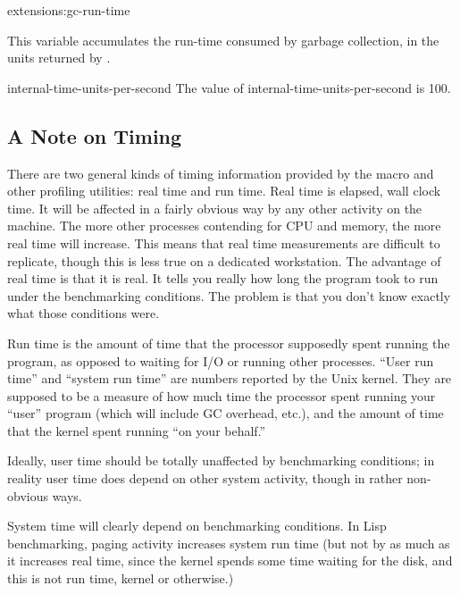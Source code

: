 \begin{defvar}{extensions:}{gc-run-time}
  
  This variable accumulates the run-time consumed by garbage
  collection, in the units returned by
  .
\end{defvar}

\begin{defconst}{}{internal-time-units-per-second}
The value of internal-time-units-per-second is 100.
\end{defconst}

\subsection{A Note on Timing}

There are two general kinds of timing information provided by the
 macro and other profiling utilities: real time and run
time.  Real time is elapsed, wall clock time.  It will be affected in
a fairly obvious way by any other activity on the machine.  The more
other processes contending for CPU and memory, the more real time will
increase.  This means that real time measurements are difficult to
replicate, though this is less true on a dedicated workstation.  The
advantage of real time is that it is real.  It tells you really how
long the program took to run under the benchmarking conditions.  The
problem is that you don't know exactly what those conditions were.

Run time is the amount of time that the processor supposedly spent
running the program, as opposed to waiting for I/O or running other
processes.  ``User run time'' and ``system run time'' are numbers
reported by the Unix kernel.  They are supposed to be a measure of how
much time the processor spent running your ``user'' program (which
will include GC overhead, etc.), and the amount of time that the
kernel spent running ``on your behalf.''

Ideally, user time should be totally unaffected by benchmarking
conditions; in reality user time does depend on other system activity,
though in rather non-obvious ways.

System time will clearly depend on benchmarking conditions.  In Lisp
benchmarking, paging activity increases system run time (but not by as much
as it increases real time, since the kernel spends some time waiting for
the disk, and this is not run time, kernel or otherwise.)

